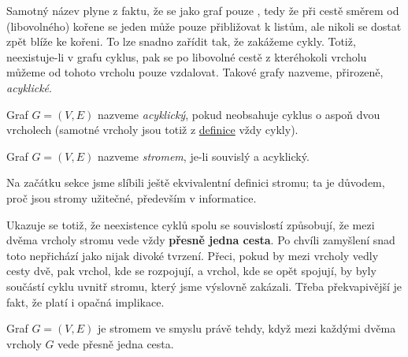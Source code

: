 Samotný název  plyne z faktu, že se jako graf pouze , tedy
že při cestě směrem od (libovolného) kořene se jeden může pouze přibližovat k
listům, ale nikoli se dostat zpět blíže ke kořeni. To lze snadno zařídit tak, že
zakážeme cykly. Totiž, neexistuje-li v grafu cyklus, pak se po libovolné cestě z
kteréhokoli vrcholu můžeme od tohoto vrcholu pouze vzdalovat. Takové grafy
nazveme, přirozeně, \emph{acyklické}.

\begin{definition}
\label{def:acyklicky-graf}
 Graf $G = (V,E)$ nazveme \emph{acyklický}, pokud neobsahuje cyklus o aspoň dvou
 vrcholech (samotné vrcholy jsou totiž z \hyperref[def:cyklus]{definice} vždy
 cykly).
\end{definition}

\begin{definition}[Strom]
\label{def:strom}
 Graf $G = (V,E)$ nazveme \emph{stromem}, je-li souvislý a acyklický.
\end{definition}

Na začátku sekce jsme slíbili ještě ekvivalentní definici stromu; ta je důvodem,
proč jsou stromy užitečné, především v informatice.

Ukazuje se totiž, že neexistence cyklů spolu se souvislostí způsobují, že mezi
dvěma vrcholy stromu vede vždy \textbf{přesně jedna cesta}. Po chvíli zamyšlení
snad toto nepřichází jako nijak divoké tvrzení. Přeci, pokud by mezi vrcholy
vedly cesty dvě, pak vrchol, kde se rozpojují, a vrchol, kde se opět spojují, by
byly součástí cyklu uvnitř stromu, který jsme výslovně zakázali. Třeba
překvapivější je fakt, že platí i opačná implikace.

\begin{claim}
 \label{claim:ekvivalentni-definice-stromu}
 Graf $G = (V,E)$ je stromem ve smyslu  právě tehdy,
 když mezi každými dvěma vrcholy $G$ vede přesně jedna cesta.
\end{claim}

